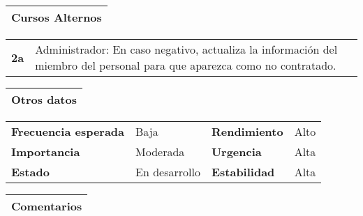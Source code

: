 \documentclass[11pt,a4paper]{article}
\begin{document}
\begin{table}[H]
	\begin{tabularx}{\textwidth}{X}
		\textbf{Cursos Alternos}\\ \hline
	\end{tabularx}
	
	\begin{tabularx}{\textwidth}{cX}
		\textbf{2a} & Administrador: En caso negativo, actualiza la información del miembro del personal para que aparezca como no contratado.
	\end{tabularx}
\end{table}

\begin{table}[H]
	\begin{tabularx}{\textwidth}{X}
		\textbf{Otros datos}\\ \hline
	\end{tabularx}
	
	\begin{tabularx}{\textwidth}{lXlX}
		\textbf{Frecuencia esperada} & Baja & \textbf{Rendimiento} & Alto \\
		\textbf{Importancia} & Moderada & \textbf{Urgencia} & Alta \\
		\textbf{Estado} & En desarrollo & \textbf{Estabilidad} & Alta \\
	\end{tabularx}
	
	\begin{tabularx}{\textwidth}{X}
		\textbf{Comentarios}\\ \hline
	\end{tabularx}
	
\end{table}

\newpage


\end{document}

